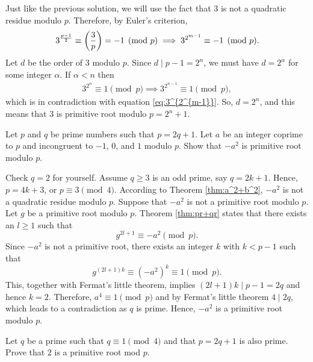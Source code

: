 \documentclass{subfile}
\begin{document}
	\begin{solution}[2]
		Just like the previous solution, we will use the fact that $3$ is not a quadratic residue modulo $p$. Therefore, by Euler's criterion,
			\begin{align}\label{eq:3^{2^{m-1}}}
				3^{\frac{p-1}{2}} \equiv  \left( \frac{3}{p} \right) = -1 \pmod p \implies 3^{2^{m-1}} \equiv -1 \pmod p.
			\end{align}
		Let $d$ be the order of $3$ modulo $p$. Since $d\mid p-1=2^n$, we must have $d=2^{\alpha}$ for some integer $\alpha$. If $\alpha<n$ then
			\begin{align*}
				3^{2^{\alpha}}\equiv 1\pmod{p}\implies 3^{2^{n-1}}\equiv 1\pmod{p},
			\end{align*}
		which is in contradiction with equation \eqref{eq:3^{2^{m-1}}}. So, $d=2^n$, and this means that $3$ is primitive root modulo $p=2^n+1$.
	\end{solution}

	\begin{problem}
		Let $p$ and $q$ be prime numbers such that $ p=2q+1$. Let $a$ be an integer coprime to $p$ and incongruent to $-1$, $0$, and $1$ modulo $p$. Show that $ -a^2$ is primitive root modulo $p$.
	\end{problem}

	\begin{solution}
		Check $ q=2$ for yourself. Assume $ q \ge 3$ is an odd prime, say $q=2k+1$. Hence, $ p=4k+3$, or $p \equiv 3 \pmod 4$. According to Theorem \ref{thm:a^2+b^2}, $ -a^2$ is not a quadratic residue modulo $ p$. Suppose that $ -a^2$ is not a primitive root modulo $p$. Let $ g$ be a primitive root modulo $p$. Theorem \ref{thm:pr+qr} states that there exists an $ l\ge 1$ such that $$g^{2l+1} \equiv -a^2 \pmod p.$$ Since $-a^2$ is not a primitive root, there exists an integer $k$ with $ k<p-1$ such that \[g^{(2l+1)k} \equiv (-a^2)^k \equiv 1 \pmod p .\] This, together with Fermat's little theorem, implies $ (2l+1)k \mid p-1=2q$ and hence $ k=2$. Therefore, $ a^4 \equiv 1 \pmod p$ and by Fermat's little theorem $ 4\mid 2q$, which leads to a contradiction as $q$ is prime. Hence, $ -a^2$ is a primitive root modulo $p$.
	\end{solution}

	\begin{problem}
		Let $q$ be a prime such that $q\equiv 1\pmod 4$ and that $p=2q+1$ is also prime. Prove that $2$ is a primitive root mod $p$.
	\end{problem}
\end{document}
